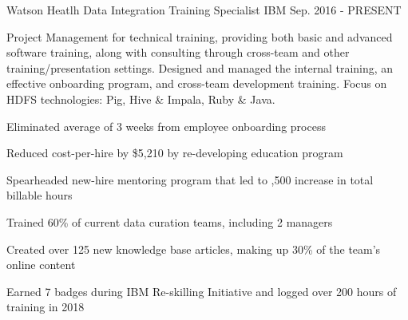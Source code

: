 

\begin{cventries}

  \cventry
    {Watson Heatlh} %
    {Data Integration Training Specialist} %
    {IBM} %
    {Sep. 2016 - PRESENT} %
    {
      \begin{cvparagraph}
        Project Management for technical training, providing both basic and advanced software training, along with consulting through cross-team and other training/presentation settings.  Designed and managed the internal training, an effective onboarding program, and cross-team development training.  Focus on HDFS technologies: Pig, Hive \& Impala, Ruby \& Java.  
      \end{cvparagraph}
      \begin{cvitems} %
        \item {Eliminated average of 3 weeks from employee onboarding process}
        \item {Reduced cost-per-hire by \$5,210 by re-developing education program}
        \item {Spearheaded new-hire mentoring program that led to ,500 increase in total billable hours}
        \item {Trained 60\% of current data curation teams, including 2 managers}
        \item {Created over 125 new knowledge base articles, making up 30\% of the team's online content}
        \item {Earned 7 badges during IBM Re-skilling Initiative and logged over 200 hours of training in 2018}
      \end{cvitems}
    }


\end{cventries}
